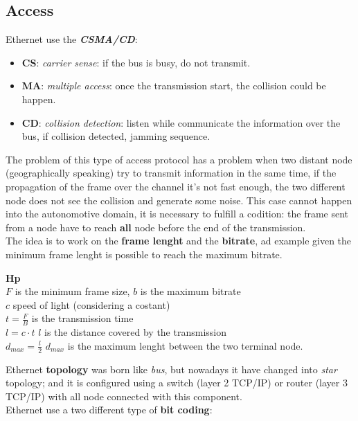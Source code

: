 \subsection{Access}
Ethernet use the \textbf{\textit{CSMA/CD}}:
\begin{itemize}[nosep]
    \item \textbf{CS}: \textit{carrier sense}: if the bus is busy, do not transmit.
    \item \textbf{MA}: \textit{multiple access}: once the transmission start, the collision could be happen.
    \item \textbf{CD}: \textit{collision detection}: listen while communicate the information over the bus, if collision detected, jamming sequence.
\end{itemize}
The problem of this type of access protocol has a problem when two distant node (geographically speaking) try to transmit information in the same time, if the propagation of the frame over the channel it's not fast enough, the two different node does not see the collision and generate some noise. This case cannot happen into the autonomotive domain, it is necessary to fulfill a codition: the frame sent from a node have to reach \textbf{all} node before the end of the transmission. \\
The idea is to work on the \textbf{frame lenght} and the \textbf{bitrate}, ad example given the minimum frame lenght is possible to reach the maximum bitrate.
\begin{boxA}
    \textbf{Hp} \\
    $F$ is the minimum frame size, $b$ is the maximum bitrate \\
    $c$ speed of light (considering a costant) \\
    $t = \frac{F}{B}$ is the transmission time \\
    $l = c \cdot t$ $l$ is the distance covered by the transmission \\
    $d_{max} = \frac{l}{2}$ $d_{max}$ is the maximum lenght between the two terminal node.
\end{boxA}
Ethernet \textbf{topology} was born like \textit{bus}, but nowadays it have changed into \textit{star} topology; and it is configured using a switch (layer 2 TCP/IP) or router (layer 3 TCP/IP) with all node connected with this component. \\
Ethernet use a two different type of \textbf{bit coding}:
